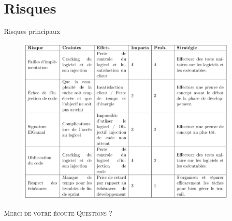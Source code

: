 \documentclass{cubeamer}
\begin{document}
\section{Risques}

\begin{frame}{Risques principaux}
    \begin{figure}
        \centering
        \vspace{-2mm}
        \includegraphics[scale=0.2]{img/risques.png}
    \end{figure}
\end{frame}

\begin{frame}[standout]
    \Huge\textsc{Merci de votre écoute}
    \vfill
    \LARGE\textsc{Questions ?}
\end{frame}
\end{document}
